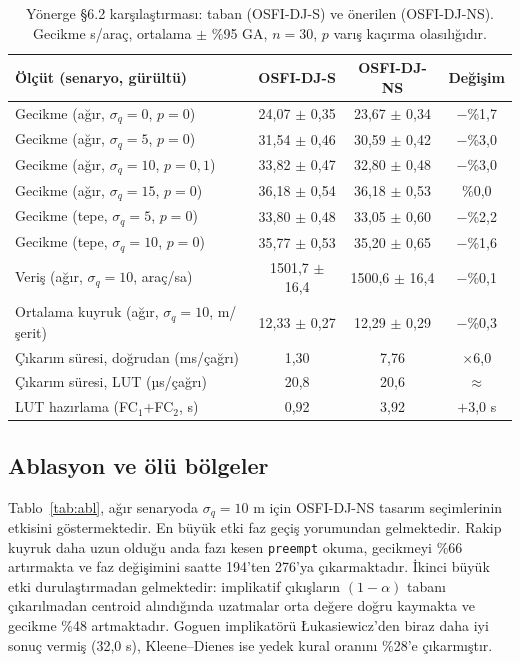 \documentclass[11pt,a4paper]{article}
\theoremstyle{definition}
\newcommand{\osfis}{OSFI-DJ-S}
\newcommand{\osfins}{OSFI-DJ-NS}
\begin{document}
\begin{table}[t]
\centering
\caption{Yönerge §6.2 karşılaştırması: taban (\osfis) ve önerilen (\osfins). Gecikme s/araç, ortalama $\pm$ \%95 GA, $n=30$, $p$ varış kaçırma olasılığıdır.}
\label{tab:contrib}
\small
\begin{tabular}{@{}lccc@{}}
\toprule
Ölçüt (senaryo, gürültü) & \osfis & \osfins & Değişim \\
\midrule
Gecikme (ağır, $\sigma_q=0$, $p=0$) & 24,07 $\pm$ 0,35 & 23,67 $\pm$ 0,34 & $-$\%1,7 \\
Gecikme (ağır, $\sigma_q=5$, $p=0$) & 31,54 $\pm$ 0,46 & 30,59 $\pm$ 0,42 & $-$\%3,0 \\
Gecikme (ağır, $\sigma_q=10$, $p=0{,}1$) & 33,82 $\pm$ 0,47 & 32,80 $\pm$ 0,48 & $-$\%3,0 \\
Gecikme (ağır, $\sigma_q=15$, $p=0$) & 36,18 $\pm$ 0,54 & 36,18 $\pm$ 0,53 & \%0,0 \\
Gecikme (tepe, $\sigma_q=5$, $p=0$) & 33,80 $\pm$ 0,48 & 33,05 $\pm$ 0,60 & $-$\%2,2 \\
Gecikme (tepe, $\sigma_q=10$, $p=0$) & 35,77 $\pm$ 0,53 & 35,20 $\pm$ 0,65 & $-$\%1,6 \\
Veriş (ağır, $\sigma_q=10$, araç/sa) & 1501,7 $\pm$ 16,4 & 1500,6 $\pm$ 16,4 & $-$\%0,1 \\
Ortalama kuyruk (ağır, $\sigma_q=10$, m/şerit) & 12,33 $\pm$ 0,27 & 12,29 $\pm$ 0,29 & $-$\%0,3 \\
Çıkarım süresi, doğrudan (ms/çağrı) & 1,30 & 7,76 & $\times$6,0 \\
Çıkarım süresi, LUT (µs/çağrı) & 20,8 & 20,6 & $\approx$ \\
LUT hazırlama (FC$_1$+FC$_2$, s) & 0,92 & 3,92 & $+$3,0 s \\
\bottomrule
\end{tabular}
\end{table}

\subsection{Ablasyon ve ölü bölgeler}
\label{sec:res-abl}

Tablo~\ref{tab:abl}, ağır senaryoda $\sigma_q=10$ m için \osfins{} tasarım seçimlerinin etkisini göstermektedir. En büyük etki faz geçiş yorumundan gelmektedir. Rakip kuyruk daha uzun olduğu anda fazı kesen \texttt{preempt} okuma, gecikmeyi \%66 artırmakta ve faz değişimini saatte 194'ten 276'ya çıkarmaktadır. İkinci büyük etki durulaştırmadan gelmektedir: implikatif çıkışların $(1-\alpha)$ tabanı çıkarılmadan centroid alındığında uzatmalar orta değere doğru kaymakta ve gecikme \%48 artmaktadır. Goguen implikatörü Łukasiewicz'den biraz daha iyi sonuç vermiş (32,0 s), Kleene--Dienes ise yedek kural oranını \%28'e çıkarmıştır.
\end{document}

